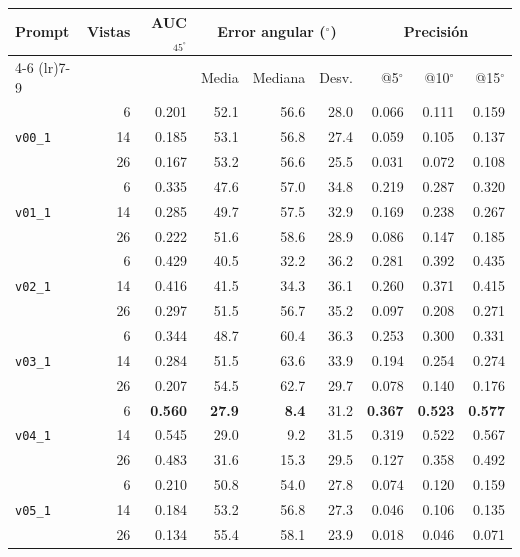 \begin{table}[H]
\begin{tabular*}{\textwidth}{@{\extracolsep{\fill}}lrrrrrrrr@{}}
\toprule
\multirow{2}{*}{Prompt} & \multirow{2}{*}{Vistas} & \multirow{2}{*}{AUC$_{45^\circ}$} & \multicolumn{3}{c}{Error angular ($^\circ$)} & \multicolumn{3}{c}{Precisión} \\
\cmidrule(lr){4-6} \cmidrule(lr){7-9}
 &  &  & Media & Mediana & Desv. & @5$^\circ$ & @10$^\circ$ & @15$^\circ$ \\
\midrule
\multirow{3}{*}{\texttt{v00\_1}} & 6 & 0.201 & 52.1 & 56.6 & 28.0 & 0.066 & 0.111 & 0.159 \\
 & 14 & 0.185 & 53.1 & 56.8 & 27.4 & 0.059 & 0.105 & 0.137 \\
 & 26 & 0.167 & 53.2 & 56.6 & 25.5 & 0.031 & 0.072 & 0.108 \\
\midrule
\multirow{3}{*}{\texttt{v01\_1}} & 6 & 0.335 & 47.6 & 57.0 & 34.8 & 0.219 & 0.287 & 0.320 \\
 & 14 & 0.285 & 49.7 & 57.5 & 32.9 & 0.169 & 0.238 & 0.267 \\
 & 26 & 0.222 & 51.6 & 58.6 & 28.9 & 0.086 & 0.147 & 0.185 \\
\midrule
\multirow{3}{*}{\texttt{v02\_1}} & 6 & 0.429 & 40.5 & 32.2 & 36.2 & 0.281 & 0.392 & 0.435 \\
 & 14 & 0.416 & 41.5 & 34.3 & 36.1 & 0.260 & 0.371 & 0.415 \\
 & 26 & 0.297 & 51.5 & 56.7 & 35.2 & 0.097 & 0.208 & 0.271 \\
\midrule
\multirow{3}{*}{\texttt{v03\_1}} & 6 & 0.344 & 48.7 & 60.4 & 36.3 & 0.253 & 0.300 & 0.331 \\
 & 14 & 0.284 & 51.5 & 63.6 & 33.9 & 0.194 & 0.254 & 0.274 \\
 & 26 & 0.207 & 54.5 & 62.7 & 29.7 & 0.078 & 0.140 & 0.176 \\
\midrule
\multirow{3}{*}{\texttt{v04\_1}} & 6 & \textbf{0.560} & \textbf{27.9} & \textbf{8.4} & 31.2 & \textbf{0.367} & \textbf{0.523} & \textbf{0.577} \\
 & 14 & 0.545 & 29.0 & 9.2 & 31.5 & 0.319 & 0.522 & 0.567 \\
 & 26 & 0.483 & 31.6 & 15.3 & 29.5 & 0.127 & 0.358 & 0.492 \\
\midrule
\multirow{3}{*}{\texttt{v05\_1}} & 6 & 0.210 & 50.8 & 54.0 & 27.8 & 0.074 & 0.120 & 0.159 \\
 & 14 & 0.184 & 53.2 & 56.8 & 27.3 & 0.046 & 0.106 & 0.135 \\
 & 26 & 0.134 & 55.4 & 58.1 & 23.9 & 0.018 & 0.046 & 0.071 \\
\bottomrule
\end{tabular*}


\end{table}
